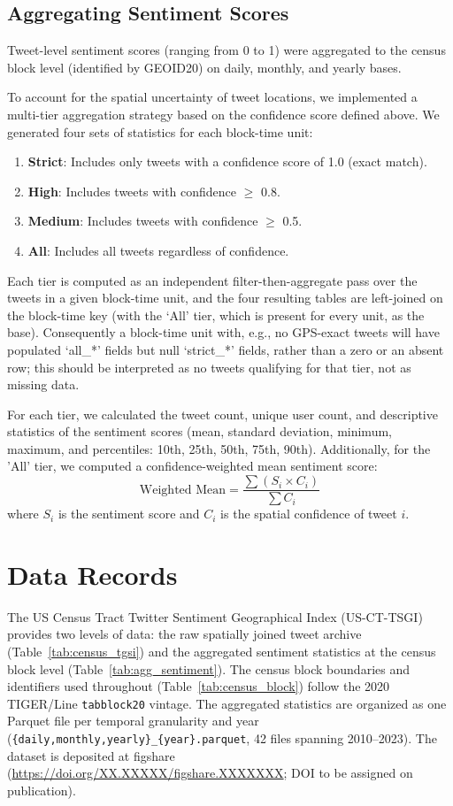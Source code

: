 \documentclass[fleqn,10pt]{wlscirep}
\begin{document}
\subsection*{Aggregating Sentiment Scores}

Tweet-level sentiment scores (ranging from 0 to 1) were aggregated to the census block level (identified by GEOID20) on daily, monthly, and yearly bases.

To account for the spatial uncertainty of tweet locations, we implemented a multi-tier aggregation strategy based on the confidence score defined above. We generated four sets of statistics for each block-time unit:
\begin{enumerate}
    \item \textbf{Strict}: Includes only tweets with a confidence score of 1.0 (exact match).
    \item \textbf{High}: Includes tweets with confidence $\ge$ 0.8.
    \item \textbf{Medium}: Includes tweets with confidence $\ge$ 0.5.
    \item \textbf{All}: Includes all tweets regardless of confidence.
\end{enumerate}
Each tier is computed as an independent filter-then-aggregate pass over the tweets in a given block-time unit, and the four resulting tables are left-joined on the block-time key (with the `All' tier, which is present for every unit, as the base). Consequently a block-time unit with, e.g., no GPS-exact tweets will have populated `all\_*' fields but null `strict\_*' fields, rather than a zero or an absent row; this should be interpreted as no tweets qualifying for that tier, not as missing data.

For each tier, we calculated the tweet count, unique user count, and descriptive statistics of the sentiment scores (mean, standard deviation, minimum, maximum, and percentiles: 10th, 25th, 50th, 75th, 90th). Additionally, for the 'All' tier, we computed a confidence-weighted mean sentiment score:
\[
\text{Weighted Mean} = \frac{\sum (S_i \times C_i)}{\sum C_i}
\]
where $S_i$ is the sentiment score and $C_i$ is the spatial confidence of tweet $i$.

\section*{Data Records}

The US Census Tract Twitter Sentiment Geographical Index (US-CT-TSGI) provides two levels of data: the raw spatially joined tweet archive (Table~\ref{tab:census_tgsi}) and the aggregated sentiment statistics at the census block level (Table~\ref{tab:agg_sentiment}). The census block boundaries and identifiers used throughout (Table~\ref{tab:census_block}) follow the 2020 TIGER/Line \texttt{tabblock20} vintage. The aggregated statistics are organized as one Parquet file per temporal granularity and year (\texttt{\{daily,monthly,yearly\}\_\{year\}.parquet}, 42 files spanning 2010--2023). The dataset is deposited at figshare (\url{https://doi.org/XX.XXXXX/figshare.XXXXXXX}; DOI to be assigned on publication).
\end{document}
